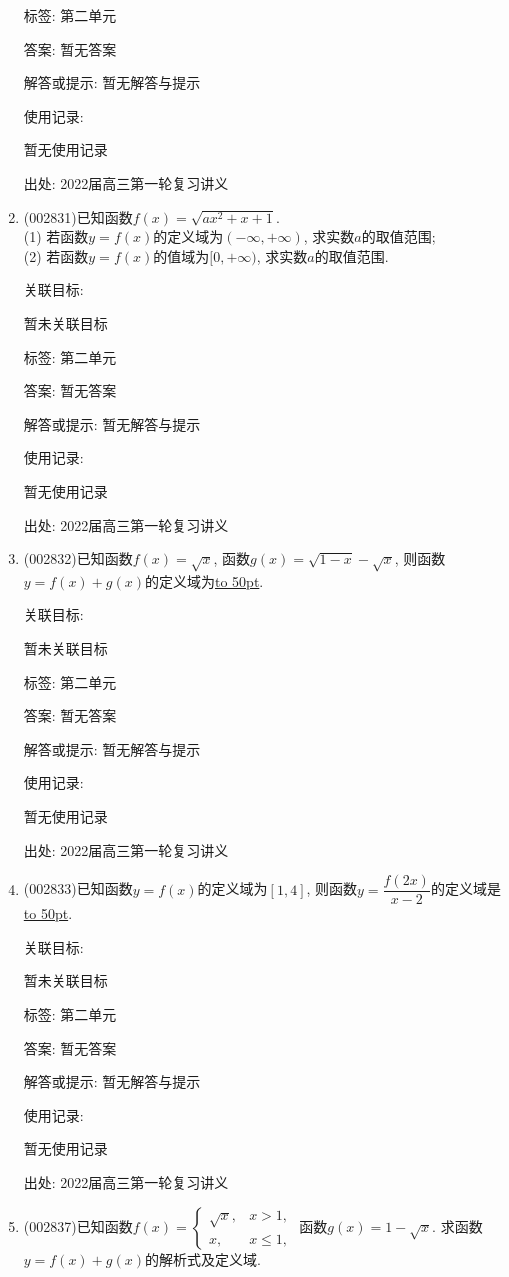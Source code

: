 \documentclass[10pt,a4paper]{article}
\newcommand{\blank}[1]{\underline{\hbox to #1pt{}}}
\begin{document}
\begin{enumerate}[1.]
标签: 第二单元

答案: 暂无答案

解答或提示: 暂无解答与提示

使用记录:

暂无使用记录


出处: 2022届高三第一轮复习讲义
\item { (002831)}已知函数$f(x)=\sqrt{ax^2+x+1}$.\\
(1) 若函数$y=f(x)$的定义域为$(-\infty ,+\infty)$, 求实数$a$的取值范围;\\
(2) 若函数$y=f(x)$的值域为$[0,+\infty)$, 求实数$a$的取值范围.


关联目标:

暂未关联目标



标签: 第二单元

答案: 暂无答案

解答或提示: 暂无解答与提示

使用记录:

暂无使用记录


出处: 2022届高三第一轮复习讲义
\item { (002832)}已知函数$f(x)=\sqrt x$, 函数$g(x)=\sqrt{1-x}-\sqrt x$, 则函数$y=f(x)+g(x)$的定义域为\blank{50}.


关联目标:

暂未关联目标



标签: 第二单元

答案: 暂无答案

解答或提示: 暂无解答与提示

使用记录:

暂无使用记录


出处: 2022届高三第一轮复习讲义
\item { (002833)}已知函数$y=f(x)$的定义域为$[1,4]$, 则函数$y=\dfrac{f(2x)}{x-2}$的定义域是\blank{50}.


关联目标:

暂未关联目标



标签: 第二单元

答案: 暂无答案

解答或提示: 暂无解答与提示

使用记录:

暂无使用记录


出处: 2022届高三第一轮复习讲义
\item { (002837)}已知函数$f(x)=\begin{cases} \sqrt x, & x>1, \\ x, &x\le 1,  \end{cases}$ 函数$g(x)=1-\sqrt x$. 求函数$y=f(x)+g(x)$的解析式及定义域.



\end{enumerate}
\end{document}
